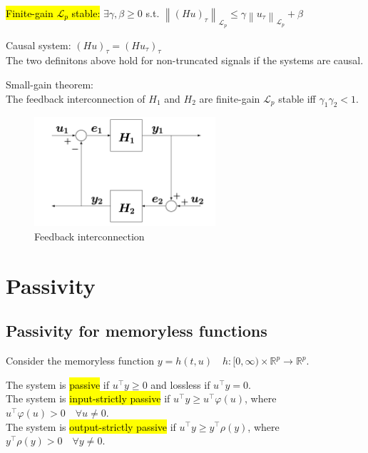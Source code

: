 \begin{definition}
    \hl{Finite-gain $\mathscr{L}_{p}$ stable:}
    $\exists\gamma, \beta \geq 0$ s.t. $\left\|(H u)_{\tau}\right\|_{\mathscr{L}_{p}} \leq \gamma\left\|u_{\tau}\right\|_{\mathscr{L}_{p}}+\beta$
\end{definition}
\begin{definition}
    Causal system: $(H u)_{\tau}=\left(H u_{\tau}\right)_{\tau}$\\
    The two definitons above hold for non-truncated signals if the systems are causal.
\end{definition}

\begin{theorem}
    Small-gain theorem:\\
    The feedback interconnection of $H_1$ and $H_2$ are finite-gain $\mathscr{L}_{p}$ stable
    iff $\gamma_1 \gamma_2 < 1$.
\end{theorem}
\begin{figure}[!htb]
        \includegraphics[width = 0.6\textwidth]{figures/fb.png}
        \caption{Feedback interconnection}
\end{figure}
\newpage
\section{Passivity}
\subsection{Passivity for memoryless functions}
Consider the memoryless function $y=h(t, u) \quad h:[0, \infty) \times \mathbb{R}^{p} \rightarrow \mathbb{R}^{p}$.
\begin{definition}
    The system is \hl{passive} if $u^{\top} y \geq 0$ and lossless if $u^{\top} y=0$.\\
    The system is \hl{input-strictly passive} if $u^{\top} y \geq u^{\top} \varphi(u)$, where $u^{\top} \varphi(u)>0 \quad \forall u \neq 0$.\\
    The system is \hl{output-strictly passive} if $u^{\top} y \geq y^{\top} \rho(y)$, where $y^{\top} \rho(y)>0 \quad \forall y \neq 0$.
\end{definition}

